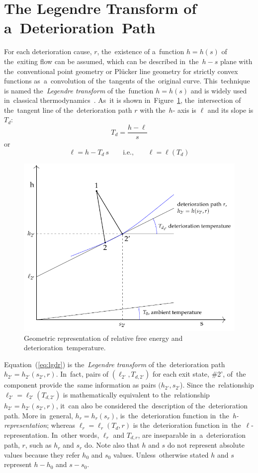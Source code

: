 \documentclass[energies,article,accept,moreauthors,pdftex]{Definitions/mdpi}
\begin{document}
\section{The Legendre Transform of a~Deterioration~Path}
For each deterioration cause, $r$, the~existence of a~function $h = h(s)$ of the~exiting flow can be assumed, which can be described in~the~$h-s$ plane with the~conventional point geometry or Plücker line geometry for strictly convex functions as~a~convolution of the~tangents of the~original curve. This~technique is named the~\emph{Legendre transform} of the~function $h = h(s)$ and is widely used in~classical thermodynamics~\cite{Callen1985,Alberty2001}. As~it is shown in~Figure~\ref{fig:rfe}, the~intersection of the~tangent line of the~deterioration path $r$  with the~$h$- axis is $\ell$ and its slope is $T_d$:
\[
T_d=\frac{h-\ell}{s}
\]
or
\begin{equation}
\ell=h-T_d\,s \qquad \text{i.e.,} \qquad \ell=\ell(T_d)
\label{eq:lgdr}
\end{equation}

\begin{figure}[H]
	\centering
	\includegraphics[scale=0.78]{rfe.pdf}
	\caption{Geometric representation of relative free energy and deterioration~temperature.}
	\label{fig:rfe}
\end{figure}

Equation~(\ref{eq:lgdr}) is the~\emph{Legendre transform} of the~deterioration path $h_{2'}=h_{2'}(s_{2'},r)$. In~fact, pairs of $(\ell_{2'} , T_{d,2'})$ for each exit state, \#2', of~the component provide the~same information as pairs $(h_{2'},s_{2'}$). Since the~relationship  $\ell_{2'} = \ell_{2'}(T_{d,2'})$ is mathematically equivalent to the~relationship $h_{2'} = h_{2'} (s_{2'}, r)$, it~can also be considered the~description of the~deterioration path. More in~general, $h_r=h_r (s_r)$, is~the~deterioration function in~the~\emph{h-representation}; whereas $\ell_r = \ell_r(T_d,r)$ is the~deterioration function in~the~$\ell$-representation. In~other words, $\ell_r$ and $T_{d,r}$, are inseparable in~a~deterioration path, $r$, such as $h_r$ and $s_r$ do. Note also that $h$ and $s$ do not represent absolute values because they refer $h_0$ and $s_0$ values. Unless~otherwise stated $h$ and $s$ represent $h-h_0$ and $s-s_0$.
\end{document}
